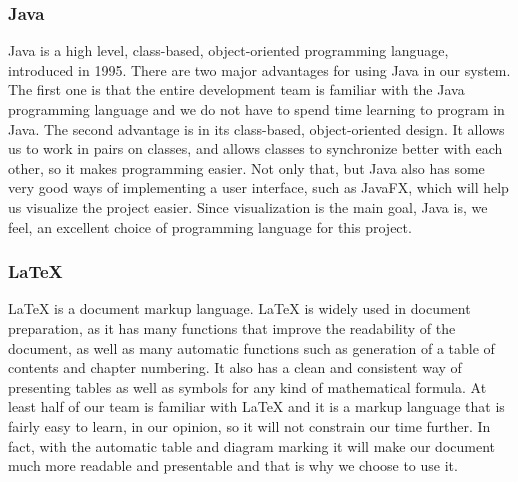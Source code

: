\documentclass[../document]{subfiles}
\begin{document}
\subsubsection{\gls{Java}}
\gls{Java} is a high level, class-based, object-oriented programming language, introduced in 1995. There are two major advantages for using \gls{Java} in our system. The first one is that the entire development team is familiar with the \gls{Java} programming language and we do not have to spend time learning to program in \gls{Java}. The second advantage is in its class-based, object-oriented design. It allows us to work in pairs on classes, and allows classes to synchronize better with each other, so it makes programming easier. Not only that, but \gls{Java} also has some very good ways of implementing a user interface, such as \gls{JavaFX}, which will help us visualize the project easier. Since visualization is the main goal, \gls{Java} is, we feel, an excellent choice of programming language for this project.

\subsubsection{\LaTeX}
LaTeX is a document markup language. LaTeX is widely used in document preparation, as it has many functions that improve the readability of the document, as well as many automatic functions such as generation of a table of contents and chapter numbering. It also has a clean and consistent way of presenting tables as well as symbols for any kind of mathematical formula. At least half of our team is familiar with LaTeX and it is a markup language that is fairly easy to learn, in our opinion, so it will not constrain our time further. In fact, with the automatic table and diagram marking it will make our document much more readable and presentable and that is why we choose to use it.
\end{document}
